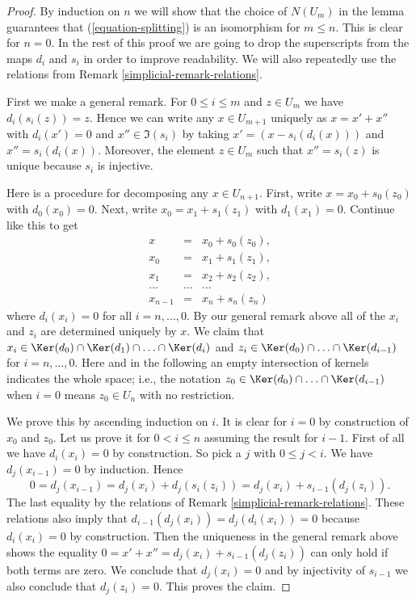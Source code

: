 \begin{proof}

By induction on $n$ we will show that the choice of $N(U_m)$
in the lemma guarantees that (\ref{equation-splitting}) is
an isomorphism for $m \leq n$. This is clear for $n = 0$.
In the rest of this proof we are going to
drop the superscripts from the maps $d_i$ and $s_i$ in order
to improve readability. We will also repeatedly use the relations
from Remark \ref{simplicial-remark-relations}.

\medskip\noindent
First we make a general remark.
For $0 \leq i \leq m$ and $z \in U_m$ we have
$d_i(s_i(z)) = z$. Hence we can write
any $x \in U_{m + 1}$ uniquely as
$x = x' + x''$ with $d_i(x') = 0$
and $x'' \in \Im(s_i)$
by taking $x' = (x - s_i(d_i(x)))$ and
$x'' = s_i(d_i(x))$. Moreover, the element
$z \in U_m$ such that $x'' = s_i(z)$
is unique because $s_i$ is injective.

\medskip\noindent
Here is a procedure for decomposing any $x \in U_{n + 1}$.
First, write $x = x_0 + s_0(z_0)$ with $d_0(x_0) = 0$.
Next, write $x_0 = x_1 + s_1(z_1)$ with
$d_1(x_1) = 0$. Continue like this to get
\begin{eqnarray*}
x & = & x_0 + s_0(z_0), \\
x_0 & = & x_1 + s_1(z_1), \\
x_1 & = & x_2 + s_2(z_2), \\
\ldots & \ldots & \ldots \\
x_{n - 1} & = & x_n + s_n(z_n)
\end{eqnarray*}
where $d_i(x_i) = 0$ for all $i = n, \ldots, 0$.
By our general remark above all of the $x_i$
and $z_i$ are determined uniquely by $x$.
We claim that
$x_i \in
\Ker(d_0) \cap
\Ker(d_1) \cap
\ldots \cap
\Ker(d_i)$
and
$z_i \in
\Ker(d_0) \cap
\ldots \cap
\Ker(d_{i - 1})$
for $i = n, \ldots, 0$.
Here and in the following
an empty intersection of kernels indicates
the whole space; i.e.,
the notation
$z_0 \in \Ker(d_0) \cap
\ldots \cap
\Ker(d_{i - 1})$
when $i = 0$ means $z_0 \in U_n$ with no restriction.

\medskip\noindent
We prove this by ascending induction on $i$.
It is clear for $i = 0$ by construction of $x_0$ and $z_0$.
Let us prove it for $0 < i \leq n$ assuming the result for $i - 1$.
First of all we have $d_i(x_i) = 0$ by construction.
So pick a $j$ with $0 \leq j < i$. We have
$d_j(x_{i - 1}) = 0$ by induction. Hence
$$
0 = d_j(x_{i - 1})
= d_j(x_i) + d_j(s_i(z_i))
= d_j(x_i) + s_{i - 1}(d_j(z_i)).
$$
The last equality by the relations of Remark \ref{simplicial-remark-relations}.
These relations also imply that
$d_{i - 1}(d_j(x_i)) = d_j(d_i(x_i)) = 0$
because $d_i(x_i)= 0$ by construction.
Then the uniqueness in the general remark above shows the equality
$0 = x' + x'' = d_j(x_i) + s_{i - 1}(d_j(z_i))$
can only hold if both terms are zero. We conclude that
$d_j(x_i) = 0$ and by injectivity of $s_{i - 1}$ we also
conclude that $d_j(z_i) = 0$. This proves the claim.


\end{proof}
